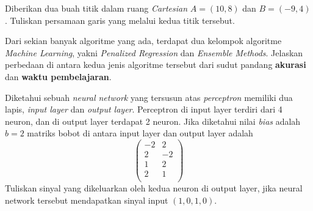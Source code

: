 \documentclass[a4paper,12pt,answers]{exam}
\begin{document}
\begin{questions}
  
  
  \question[10] Diberikan dua buah titik dalam ruang \emph{Cartesian} $A = (10, 8)$ dan $B = (-9, 4)$. Tuliskan persamaan garis yang melalui kedua titik tersebut.
  \begin{solution}
    \vspace{5.0cm}
  \end{solution}
  
  
  \question[10] Dari sekian banyak algoritme yang ada, terdapat dua kelompok algoritme \emph{Machine Learning}, yakni \emph{Penalized Regression} dan \emph{Ensemble Methods}. Jelaskan perbedaan di antara kedua jenis algoritme tersebut dari sudut pandang \textbf{akurasi} dan \textbf{waktu pembelajaran}.
  \begin{solution}
    \vspace{5.0cm}
  \end{solution}
  
  
  \question[10] Diketahui sebuah \emph{neural network} yang tersusun atas \emph{perceptron} memiliki dua lapis, \emph{input layer} dan \emph{output layer}. Perceptron di input layer terdiri dari 4 neuron, dan di output layer terdapat 2 neuron. Jika diketahui nilai \emph{bias} adalah $b = 2$ matriks bobot di antara input layer dan output layer adalah
  \[
  \left(\begin{array}{cc}
  -2 & 2 \\
  2 & -2 \\
  1 & 2 \\
  2 & 1 \\
  \end{array}
  \right)
  \]
  Tuliskan sinyal yang dikeluarkan oleh kedua neuron di output layer, jika neural network tersebut mendapatkan sinyal input $(1, 0, 1, 0)$.
  \begin{solution}
    \vspace{5.0cm}
  \end{solution}
\end{questions}
\end{document}
